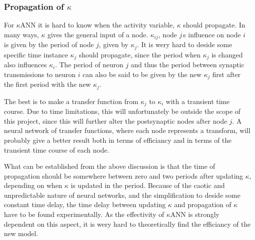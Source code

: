 	\subsubsection{Propagation of $\kappa$}
	For $\kappa$ANN it is hard to know when the activity variable, $\kappa$ should propagate. In many ways, $\kappa$ gives the general input of a node.
	$\kappa_{ij}$, node $j$\,s influence on node $i$ is given by the period of node $j$, given by $\kappa_j$. 
	It is wery hard to deside some specific time instance $\kappa_j$ should propagate, since the period when $\kappa_j$ is changed also influences $\kappa_i$. 
	The period of neuron $j$ and thus the period between synaptic transmissions to neuron $i$ can also be said to be given by the new $\kappa_j$ first after the first period with the new $\kappa_j$.
	
	The best is to make a transfer function from $\kappa_j$ to $\kappa_i$ with a transient time course. 
	Due to time limitations, this will unfortunately be outside the scope of this project, since this will further alter the postsynaptic nodes after node $j$. 
	A neural network of transfer functions, where each node represents a transform, will probably give a better result both in terms of efficiancy and in terms of the transient time course of each node.
	
	What can be established from the above discussion is that the time of propagation should be somewhere between zero and two periods after updating $\kappa$, depending on when $\kappa$ is updated in the period.
	Because of the caotic and unpredictable nature of neural networks, and the simplification to deside some constant time delay, the time delay between updating $\kappa$ and propagation of $\kappa$ have to be found experimentally.
	As the effectivity of $\kappa$ANN is strongly dependent on this aspect, it is wery hard to theoretically find the efficiancy of the new model.

